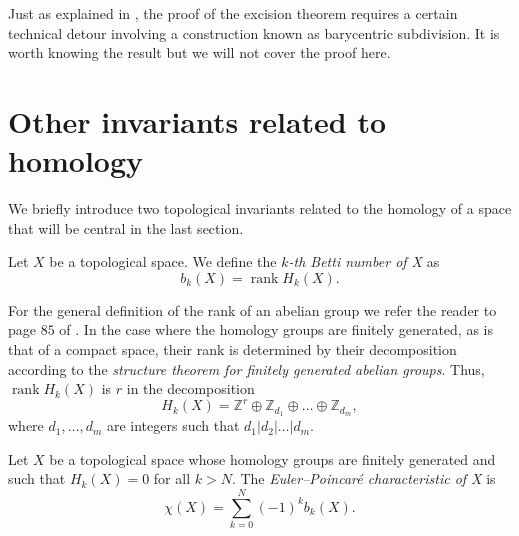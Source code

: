 Just as explained in \cite{hatcher2002}, the proof of the excision theorem requires a certain technical detour involving a construction known as barycentric subdivision. It is worth knowing the result but we will not cover the proof here.



\bigskip

\section{Other invariants related to homology}

We briefly introduce two topological invariants related to the homology of a space that will be central in the last section.

\begin{definition}
    Let $X$ be a topological space. We define the \textit{$k$-th Betti number of X} as
    \begin{equation*}
        b_k(X) = \operatorname{rank} H_k(X).
    \end{equation*}
\end{definition}


For the general definition of the rank of an abelian group we refer the reader to page $85$ of \cite{FuchsInfiniteAbelianGroupsI}. In the case where the homology groups are finitely generated, as is that of a compact space, their rank is determined by their decomposition according to the \textit{structure theorem for finitely generated abelian groups}. Thus, $\operatorname{rank} H_k(X)$ is $r$ in the decomposition
\begin{equation*}
    H_k(X) = \mathbb{Z}^r \oplus \mathbb{Z}_{d_1} \oplus\dots\oplus \mathbb{Z}_{d_m},
\end{equation*}
where $d_1,\dots,d_m$ are integers such that $d_1|d_2|\dots|d_m$.
\bigskip

\begin{definition}
    Let $X$ be a topological space whose homology groups are finitely generated and such that $H_k(X)=0$ for all $k>N$. The \textit{Euler--Poincaré characteristic of X} is
    \begin{equation*}
        \chi (X) = \sum^N_{k=0} (-1)^k b_k(X).
    \end{equation*}
\end{definition}

